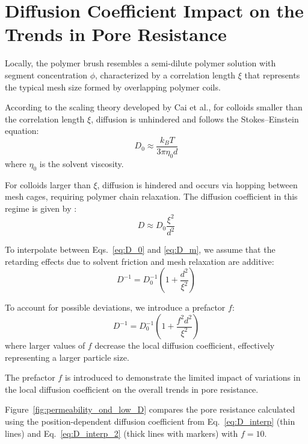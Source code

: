 \documentclass[10pt, a4paper]{article}
\begin{document}
\section{Diffusion Coefficient Impact on the Trends in Pore Resistance}
\begin{multicols}{2}
    
Locally, the polymer brush resembles a semi-dilute polymer solution with segment concentration $\phi$, characterized by a correlation length $\xi$ that represents the typical mesh size formed by overlapping polymer coils.

According to the scaling theory developed by Cai et al.\cite{Cai2011}, for colloids smaller than the correlation length $\xi$, diffusion is unhindered and follows the Stokes--Einstein equation:
\begin{equation}
D_0 \approx \frac{k_B T}{3 \pi \eta_0 d}
\label{eq:D_0}
\end{equation}
where $\eta_0$ is the solvent viscosity.

For colloids larger than $\xi$, diffusion is hindered and occurs via hopping between mesh cages, requiring polymer chain relaxation. The diffusion coefficient in this regime is given by \cite{Cai2011}:
\begin{equation}
D \approx D_0 \frac{\xi^2}{d^2}
\label{eq:D_m}
\end{equation}

To interpolate between Eqs.~\ref{eq:D_0} and \ref{eq:D_m}, we assume that the retarding effects due to solvent friction and mesh relaxation are additive:
\begin{equation}
D^{-1} = D_0^{-1} \left( 1 + \frac{d^2}{\xi^2} \right)
\label{eq:D_interp}
\end{equation}

To account for possible deviations, we introduce a prefactor $f$:
\begin{equation}
D^{-1} = D_0^{-1} \left( 1 + \frac{f^2 d^2}{\xi^2} \right)
\label{eq:D_interp_2}
\end{equation}
where larger values of $f$ decrease the local diffusion coefficient, effectively representing a larger particle size.

The prefactor $f$ is introduced to demonstrate the limited impact of variations in the local diffusion coefficient on the overall trends in pore resistance.

Figure~\ref{fig:permeability_ond_low_D} compares the pore resistance calculated using the position-dependent diffusion coefficient from Eq.~\ref{eq:D_interp} (thin lines) and Eq.~\ref{eq:D_interp_2} (thick lines with markers) with $f = 10$.


\end{multicols}
\end{document}
